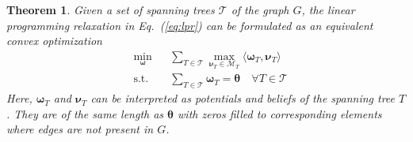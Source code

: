 \documentclass[conference]{IEEEtran}
\newtheorem{theorem}{Theorem}
\newcommand{\mM}{\mathcal{M}}
\newcommand{\mT}{\mathcal{T}}
\newcommand{\mth}{\mathbf{\boldsymbol \theta}}
\newcommand{\mnu}{\mathbf{\boldsymbol \nu}}
\newcommand{\mom}{\mathbf{\boldsymbol \omega}}
\newcommand{\la}{\langle}
\newcommand{\ra}{\rangle}
\begin{document}
\begin{theorem}
	Given a set of spanning trees $\mT$ of the graph $G$, the linear programming relaxation in Eq.~(\ref{eq:lpr}) can be formulated as an equivalent convex optimization
\begin{equation}
\begin{aligned}
	&\min_{\mom} && \sum_{T \in \mT} \max_{\mnu_T \in \mM_T} \la \mom_T, \mnu_T \ra \\
	&\textrm{s.t.} && \sum_{T \in \mT} \mom_T = \mth \quad \forall T \in \mT
\end{aligned}
\label{eq:lprdd}
\end{equation}
Here, $\mom_T$ and $\mnu_T$ can be interpreted as potentials and beliefs of the spanning tree $T$. They are of the same length as $\mth$ with zeros filled to corresponding elements where edges are not present in $G$. 
\end{theorem}
\end{document}
